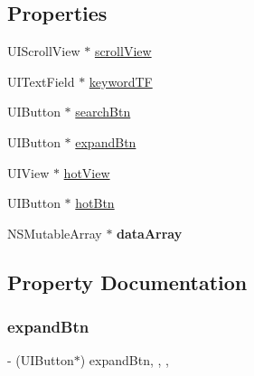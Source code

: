 \subsection*{Properties}
\begin{DoxyCompactItemize}
\item 
U\+I\+Scroll\+View $\ast$ \mbox{\hyperlink{category_t_b_rebates_view_controller_07_08_a95a8f696afb9607ec1d938be2a51a63c}{scroll\+View}}
\item 
U\+I\+Text\+Field $\ast$ \mbox{\hyperlink{category_t_b_rebates_view_controller_07_08_a2ea41cdaf7017dbd723aa54910f146cd}{keyword\+TF}}
\item 
U\+I\+Button $\ast$ \mbox{\hyperlink{category_t_b_rebates_view_controller_07_08_a74998266b9c7d278f85de0320cc6a0b5}{search\+Btn}}
\item 
U\+I\+Button $\ast$ \mbox{\hyperlink{category_t_b_rebates_view_controller_07_08_a3ff576f6214c13bb54a515f5a6164924}{expand\+Btn}}
\item 
U\+I\+View $\ast$ \mbox{\hyperlink{category_t_b_rebates_view_controller_07_08_ae55de9e4627cae1bd40862c0804331eb}{hot\+View}}
\item 
U\+I\+Button $\ast$ \mbox{\hyperlink{category_t_b_rebates_view_controller_07_08_a57a6375538b893a2acf7e1c6f25141a0}{hot\+Btn}}
\item 
\mbox{\label{category_t_b_rebates_view_controller_07_08_af1fb5627852bb73df04bb09d0682717f}} 
N\+S\+Mutable\+Array $\ast$ {\bfseries data\+Array}
\end{DoxyCompactItemize}


\subsection{Property Documentation}
\mbox{\label{category_t_b_rebates_view_controller_07_08_a3ff576f6214c13bb54a515f5a6164924}} 
\subsubsection{\texorpdfstring{expand\+Btn}{expandBtn}}
{\footnotesize\ttfamily -\/ (U\+I\+Button$\ast$) expand\+Btn\hspace{0.3cm}{\ttfamily [read]}, {\ttfamily [write]}, {\ttfamily [nonatomic]}, {\ttfamily [strong]}}

